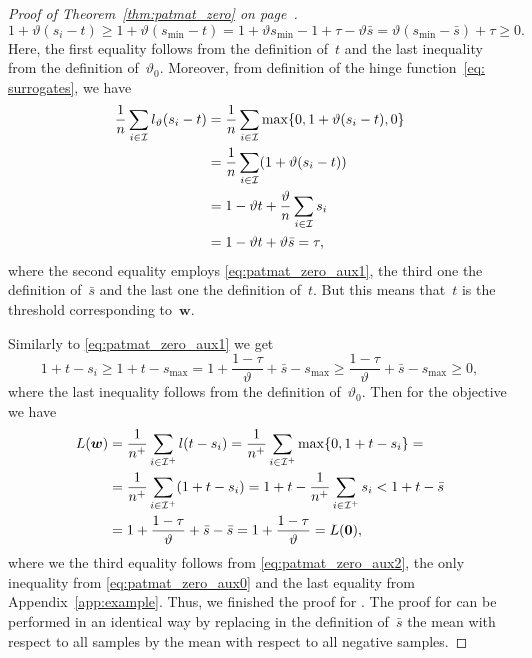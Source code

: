 \begin{proof}[Proof of Theorem~\ref{thm:patmat_zero} on page~\pageref{thm:patmat_zero}]
\begin{equation}
    1+\vartheta(s_i - t)
      \ge 1 + \vartheta(s_{\min} - t)
      = 1 + \vartheta s_{\min} - 1 + \tau - \vartheta\bar{s}
      = \vartheta (s_{\min} - \bar{s}) + \tau
      \ge 0.
  \end{equation}
  Here, the first equality follows from the definition of~$t$ and the last inequality from the definition of~$\vartheta_0$. Moreover, from definition of the hinge function~\eqref{eq: surrogates}, we have
  \begin{equation*}
    \begin{aligned}
      \frac{1}{n} \sum_{i \in \I} l_{\vartheta}(s_i - t)
      & = \frac{1}{n} \sum_{i \in \I} \max\{0, 1 + \vartheta (s_i - t), 0\} \\
      & = \frac{1}{n}\sum_{i \in \I}\Brac{1 + \vartheta(s_i - t)} \\
      & = 1 - \vartheta t + \frac{\vartheta}{n} \sum_{i \in \I} s_i \\
      & = 1 - \vartheta t + \vartheta \bar{s} = \tau,
    \end{aligned}
  \end{equation*}
  where the second equality employs \eqref{eq:patmat_zero_aux1}, the third one the definition of~$\bar{s}$ and the last one the definition of~$t$. But this means that~$t$ is the threshold corresponding to~$\bm{w}$.
  
  Similarly to \eqref{eq:patmat_zero_aux1} we get
  \begin{equation}\label{eq:patmat_zero_aux2}
    1 + t - s_i
    \ge 1 + t-s_{\max}
    =   1 + \frac{1-\tau}{\vartheta} + \bar{s} - s_{\max}
    \ge \frac{1-\tau}{\vartheta} + \bar{s} - s_{\max}
    \ge 0,
  \end{equation}
  where the last inequality follows from the definition of~$\vartheta_0$. Then for the objective we have
  \begin{equation*}
    \begin{aligned}
      L(\bm{w})
      & = \frac{1}{n^+}\sum_{i \in \I^+}l(t-s_i)
        = \frac{1}{n^+}\sum_{i \in \I^+}\max\{0, 1+t-s_i \} = \\
      & = \frac{1}{n^+}\sum_{i \in \I^+}\Brac{1+t-s_i}
        = 1 + t - \frac{1}{n^+}\sum_{i \in \I^+} s_i
        < 1 + t - \bar{s} \\
      & = 1 + \frac{1-\tau}{\vartheta} + \bar{s} -\bar{s}
        = 1 + \frac{1-\tau}{\vartheta}
        = L(\bm{0}),\\
    \end{aligned}
  \end{equation*}
  where we the third equality follows from \eqref{eq:patmat_zero_aux2}, the only inequality from \eqref{eq:patmat_zero_aux0} and the last equality from Appendix~\ref{app:example}. Thus, we finished the proof for \PatMat. The proof for \PatMatNP can be performed in an identical way by replacing in the definition of~$\bar{s}$ the mean with respect to all samples by the mean with respect to all negative samples.
\end{proof}


